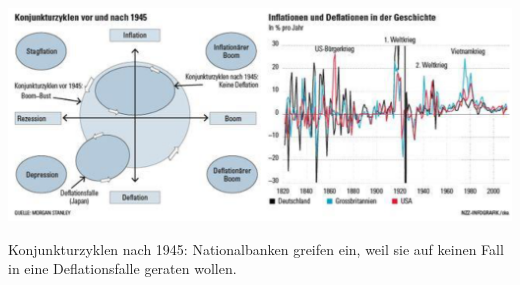 \begin{minipage}{0.75\linewidth}
	\includegraphics[width=\linewidth]{images/konjunkturzyklen2.png}
\end{minipage}%
\begin{minipage}{0.25\linewidth}
	Konjunkturzyklen nach 1945: Nationalbanken greifen ein, weil sie auf keinen Fall in eine Deflationsfalle geraten wollen.
\end{minipage}

